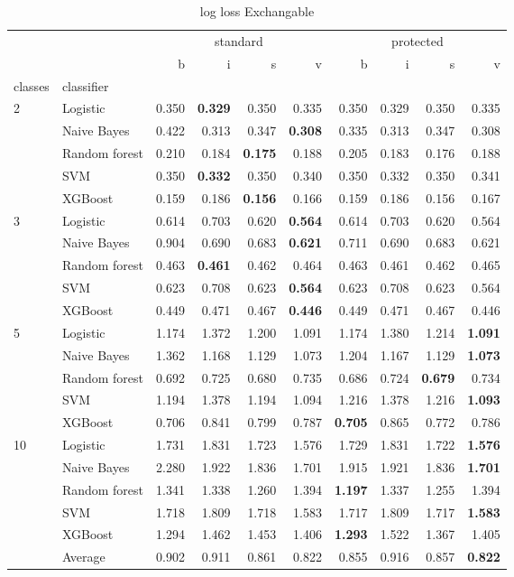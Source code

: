 \begin{table}
\caption{log loss Exchangable}
\begin{tabular}{l|l|rrrr|rrrr}
\toprule
 &  & \multicolumn{4}{c}{standard} & \multicolumn{4}{c}{protected} \\
 &  & b & i & s & v & b & i & s & v \\
classes & classifier &  &  &  &  &  &  &  &  \\
\midrule
\midrule
\multirow[c]{5}{*}{2} & Logistic & 0.350 & \textbf{0.329} & 0.350 & 0.335 & 0.350 & 0.329 & 0.350 & 0.335 \\
 & Naive Bayes & 0.422 & 0.313 & 0.347 & \textbf{0.308} & 0.335 & 0.313 & 0.347 & 0.308 \\
 & Random forest & 0.210 & 0.184 & \textbf{0.175} & 0.188 & 0.205 & 0.183 & 0.176 & 0.188 \\
 & SVM & 0.350 & \textbf{0.332} & 0.350 & 0.340 & 0.350 & 0.332 & 0.350 & 0.341 \\
 & XGBoost & 0.159 & 0.186 & \textbf{0.156} & 0.166 & 0.159 & 0.186 & 0.156 & 0.167 \\
\midrule
\multirow[c]{5}{*}{3} & Logistic & 0.614 & 0.703 & 0.620 & \textbf{0.564} & 0.614 & 0.703 & 0.620 & 0.564 \\
 & Naive Bayes & 0.904 & 0.690 & 0.683 & \textbf{0.621} & 0.711 & 0.690 & 0.683 & 0.621 \\
 & Random forest & 0.463 & \textbf{0.461} & 0.462 & 0.464 & 0.463 & 0.461 & 0.462 & 0.465 \\
 & SVM & 0.623 & 0.708 & 0.623 & \textbf{0.564} & 0.623 & 0.708 & 0.623 & 0.564 \\
 & XGBoost & 0.449 & 0.471 & 0.467 & \textbf{0.446} & 0.449 & 0.471 & 0.467 & 0.446 \\
\midrule
\multirow[c]{5}{*}{5} & Logistic & 1.174 & 1.372 & 1.200 & 1.091 & 1.174 & 1.380 & 1.214 & \textbf{1.091} \\
 & Naive Bayes & 1.362 & 1.168 & 1.129 & 1.073 & 1.204 & 1.167 & 1.129 & \textbf{1.073} \\
 & Random forest & 0.692 & 0.725 & 0.680 & 0.735 & 0.686 & 0.724 & \textbf{0.679} & 0.734 \\
 & SVM & 1.194 & 1.378 & 1.194 & 1.094 & 1.216 & 1.378 & 1.216 & \textbf{1.093} \\
 & XGBoost & 0.706 & 0.841 & 0.799 & 0.787 & \textbf{0.705} & 0.865 & 0.772 & 0.786 \\
\midrule
\multirow[c]{5}{*}{10} & Logistic & 1.731 & 1.831 & 1.723 & 1.576 & 1.729 & 1.831 & 1.722 & \textbf{1.576} \\
 & Naive Bayes & 2.280 & 1.922 & 1.836 & 1.701 & 1.915 & 1.921 & 1.836 & \textbf{1.701} \\
 & Random forest & 1.341 & 1.338 & 1.260 & 1.394 & \textbf{1.197} & 1.337 & 1.255 & 1.394 \\
 & SVM & 1.718 & 1.809 & 1.718 & 1.583 & 1.717 & 1.809 & 1.717 & \textbf{1.583} \\
 & XGBoost & 1.294 & 1.462 & 1.453 & 1.406 & \textbf{1.293} & 1.522 & 1.367 & 1.405 \\\midrule\ & Average & 0.902 & 0.911 & 0.861 & 0.822 & 0.855 & 0.916 & 0.857 & \textbf{0.822} \\
\bottomrule
\end{tabular}
\end{table}
